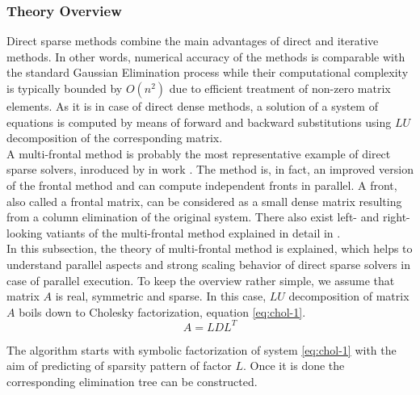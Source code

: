 \subsubsection{Theory Overview}
\label{subseq:direct-sparse methods}

Direct sparse methods combine the main advantages of direct and iterative methods. In other words, numerical accuracy of the methods is comparable with the standard Gaussian Elimination process while their computational complexity is typically bounded by $O(n^2)$ \cite{complexity-of-spdm} due to efficient treatment of non-zero matrix elements. As it is in case of direct dense methods, a solution of a system of equations is computed by means of forward and backward substitutions using $LU$ decomposition of the corresponding matrix.\\


A multi-frontal method is probably the most representative example of direct sparse solvers, inroduced by \citeauthor{mult-frontal-original:1} in work \cite{mult-frontal-original:1}. The method is, in fact, an improved version of the frontal method \cite{frontal-original} and can compute independent fronts in parallel. A front, also called a frontal matrix, can be considered as a small dense matrix resulting from a column elimination of the original system. There also exist left- and right-looking vatiants of the multi-frontal method explained in detail in \cite{elimination-tree}.\\


In this subsection, the theory of multi-frontal method is explained, which helps to understand parallel aspects and strong scaling behavior of   direct sparse solvers in case of parallel execution. To keep the overview rather simple, we assume that matrix $A$ is real, symmetric and sparse. In this case, $LU$ decomposition of matrix $A$ boils down to Cholesky factorization, equation \ref{eq:chol-1}.\\

\begin{equation} \label{eq:chol-1}
	A = LDL^T
\end{equation}

The algorithm starts with symbolic factorization of system \ref{eq:chol-1} with the aim of predicting of sparsity pattern of factor $L$. Once it is done the corresponding elimination tree can be constructed.\\

\figpointer{\ref{fig:sparsity-pattern-example-mm}}

